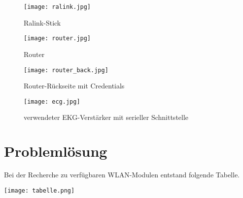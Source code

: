 \documentclass[pdftex,12pt,a4paper]{scrreprt}
\begin{document}
\begin{figure}[h] %
    \centering
    \texttt{[image: ralink.jpg]}
    \caption{Ralink-Stick}
\end{figure}
\begin{figure}[h] %
    \centering
    \texttt{[image: router.jpg]}
    \caption{Router}
\end{figure}
\begin{figure}[h] %
    \centering
    \texttt{[image: router\_back.jpg]}
    \caption{Router-Rückseite mit Credentials}
\end{figure}
\begin{figure}[h] %
    \centering
    \texttt{[image: ecg.jpg]}
    \caption{verwendeter EKG-Verstärker mit serieller Schnittstelle}
\end{figure}
\section{Problemlösung}
Bei der Recherche zu verfügbaren WLAN-Modulen entstand folgende Tabelle.
\begin{center}
    \texttt{[image: tabelle.png]}
\end{center}
\end{document}
